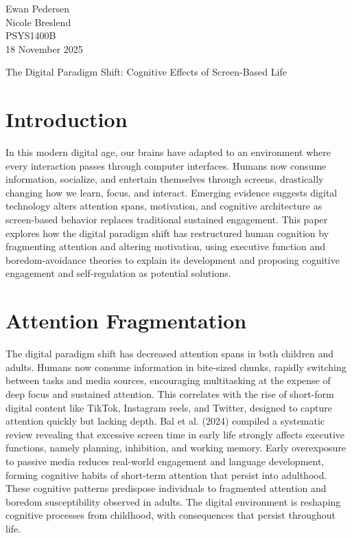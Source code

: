 \documentclass[12pt,letterpaper]{article}
\begin{document}
\noindent Ewan Pedersen\\
Nicole Breslend\\
PSYS1400B\\
18 November 2025

\begin{center}
The Digital Paradigm Shift: Cognitive Effects of Screen-Based Life
\end{center}

\section*{Introduction}

In this modern digital age, our brains have adapted to an environment where every interaction passes through computer interfaces. Humans now consume information, socialize, and entertain themselves through screens, drastically changing how we learn, focus, and interact. Emerging evidence suggests digital technology alters attention spans, motivation, and cognitive architecture as screen-based behavior replaces traditional sustained engagement. This paper explores how the digital paradigm shift has restructured human cognition by fragmenting attention and altering motivation, using executive function and boredom-avoidance theories to explain its development and proposing cognitive engagement and self-regulation as potential solutions.

\section*{Attention Fragmentation}

The digital paradigm shift has decreased attention spans in both children and adults. Humans now consume information in bite-sized chunks, rapidly switching between tasks and media sources, encouraging multitasking at the expense of deep focus and sustained attention. This correlates with the rise of short-form digital content like TikTok, Instagram reels, and Twitter, designed to capture attention quickly but lacking depth. Bal et al. (2024) compiled a systematic review revealing that excessive screen time in early life strongly affects executive functions, namely planning, inhibition, and working memory. Early overexposure to passive media reduces real-world engagement and language development, forming cognitive habits of short-term attention that persist into adulthood. These cognitive patterns predispose individuals to fragmented attention and boredom susceptibility observed in adults. The digital environment is reshaping cognitive processes from childhood, with consequences that persist throughout life.
\end{document}
